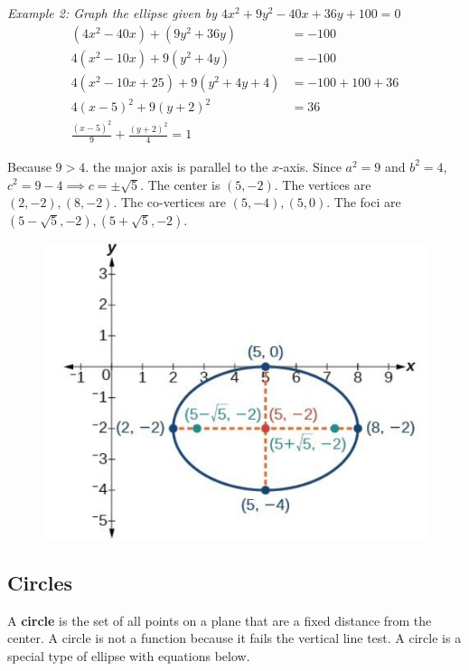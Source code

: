 \documentclass{article}
\begin{document}
    \noindent \color{blue} \textit{Example 2: Graph the ellipse given by
    $4x^2+9y^2-40x+36y+100=0$} \color{black}  \\

    \begin{align*}
        (4x^2-40x)+(9y^2+36y) &= -100 \\
        4(x^2-10x) + 9(y^2+4y) &= -100 \\
        4(x^2-10x+25)+9(y^2+4y+4) &= -100 + 100 +36 \\
        4(x-5)^2+9(y+2)^2 &= 36 \\
        \frac{(x-5)^2}{9}+\frac{(y+2)^2}{4}=1
    \end{align*}

    \noindent Because $9>4$. the major axis is parallel to the $x$-axis. Since $a^2=9$ and
    $b^2=4$, $c^2=9-4\implies c=\pm \sqrt{5}$. The center is $(5, -2)$. The vertices are
    $(2,-2),(8,-2)$. The co-vertices are $(5,-4),(5,0)$. The foci are $(5-\sqrt{5},-2),
    (5+\sqrt{5},-2)$. \\

    \begin{figure} [hbt!]
        \centering
        \includegraphics [scale=0.5] {Resources/Unit10Conics/ellipse3.PNG}
    \end{figure}

    \subsection{Circles}
    A \textbf{circle} is the set of all points on a plane that are a fixed distance from the
    center. A circle is not a function because it fails the vertical line test. A circle is a
    special type of ellipse with equations below. \\
\end{document}
